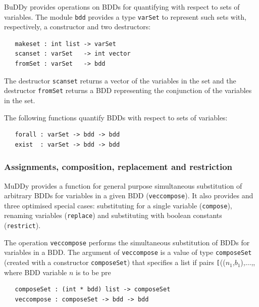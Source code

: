 \documentclass[12pt,fleqn]{book}
\renewcommand{\t}[1]{\mbox{\tt #1}}
\newcommand{\Buddy}{BuDDy{}}
\newcommand{\Muddy}{MuDDy{}}
\begin{document}
\Buddy{} provides operations on BDDs for quantifying with respect to sets
of variables. The module  \t{bdd} provides a type \t{varSet} to represent such
sets with, respectively, a constructor and two destructors:

\begin{verbatim}
   makeset : int list -> varSet
   scanset : varSet   -> int vector
   fromSet : varSet   -> bdd
\end{verbatim}

The destructor \t{scanset} returns a vector of the variables in the
set and the destructor \t{fromSet} returns a BDD representing the
conjunction of the variables in the set.

The following functions quantify BDDs with respect to sets of variables:

\begin{verbatim}
   forall : varSet -> bdd -> bdd
   exist  : varSet -> bdd -> bdd
\end{verbatim}

\subsubsection{Assignments, composition, replacement and restriction}\label{replace}

\Muddy{} provides a function for general purpose simultaneous
substitution of arbitrary BDDs for variables in a given BDD (\t{veccompose}). It also
provides and three optimised special cases: substituting for a single
variable (\t{compose}), renaming variables (\t{replace}) and
substituting with boolean constants (\t{restrict}).

The operation \t{veccompose} performs the simultaneous substitution 
of BDDs for variables in a BDD. The argument of \t{veccompose}
is a value of type \t{composeSet}
(created with a constructor \t{composeSet})
that specifies a list if pairs \t[(($n_1$,$b_1$),$\ldots$,, where BDD variable $n$ is to be pre

\begin{verbatim}
   composeSet : (int * bdd) list -> composeSet
   veccompose : composeSet -> bdd -> bdd
\end{verbatim}
\end{document}
